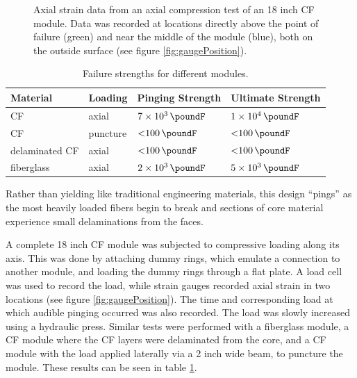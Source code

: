 \documentclass{aiaa-tc}%
\begin{document}
\begin{figure}[t]
{		\caption{
			Positioning of the strain gauges referred to in figure \ref{fig:strain}. 
			The gauges have been circled with colors corresponding to figure \ref{fig:strain}.
			Both are alligned with one of the pillars shown in figures \ref{fig:module} and \ref{fig:crush}.
			The bottom gauge is positioned directly above the point of failure.
			}
		\label{fig:gaugePosition}
	}
	\hfill
	\parbox{0.6\linewidth}
	{
		\centering
		
		\caption{
			Axial strain data from an axial compression test of an 18 inch CF module. 
			Data was recorded at locations directly above the point of failure (green) 
			and near the middle of the module (blue), both on the outside surface (see figure \ref{fig:gaugePosition}).
			}
		\label{fig:strain}
	}
\end{figure}

\begin{table}
	\centering
	\caption{Failure strengths for different modules.}
	\label{tab:compression}
	\begin{tabular}{llll}
		Material & Loading & Pinging Strength & Ultimate Strength\\
		\hline
		CF 		& axial 	& $\SI{7e3}{\poundF}$ 	& $\SI{1e4}{\poundF}$ \\
		CF 		& puncture 	& $\SI{<100}{\poundF}$	& $\SI{<100}{\poundF}$\\
		delaminated CF 	& axial 	& $\SI{<100}{\poundF}$	& $\SI{<100}{\poundF}$\\
		fiberglass 	& axial 	& $\SI{2e3}{\poundF}$ 	& $\SI{5e3}{\poundF}$ \\
	\end{tabular}
\end{table}

Rather than yielding like traditional engineering materials, this design ``pings'' as the most heavily loaded fibers begin to break and sections of core material experience small delaminations from the faces. 

A complete 18 inch CF module was subjected to compressive loading along its axis. This was done by attaching dummy rings, which emulate a connection to another module, and loading the dummy rings through a flat plate. 
A load cell was used to record the load, while strain gauges recorded axial strain in two locations (see figure \ref{fig:gaugePosition}). 
The time and corresponding load at which audible pinging occurred was also recorded.
The load was slowly increased using a hydraulic press. 
Similar tests were performed with a fiberglass module, a CF module where the CF layers were delaminated from the core, and a CF module with the load applied laterally via a 2 inch wide beam, to puncture the module.
These results can be seen in table \ref{tab:compression}.
\end{document}
